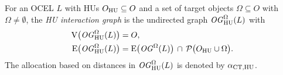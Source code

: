\begin{definition}
  For an OCEL $L$ with HUs $O_{\mathrm{HU}}\subseteq O$ and a set of target objects $\Omega\subseteq O$ with $\Omega\neq\emptyset$,
  the \textit{HU interaction graph} is the undirected graph $\mathit{OG}_{\text{HU}}^\Omega(L)$ with
  \begin{align*}
    \operatorname{V}\bigl(\mathit{OG}_{\text{HU}}^\Omega(L)\bigr) &= O, \\
    \operatorname{E}\bigl(\mathit{OG}_{\text{HU}}^\Omega(L)\bigr) &=
      \operatorname{E}\bigl(\mathit{OG}^\Omega(L)\bigr) \,\cap\, \mathcal{P}\bigl( O_{\mathrm{HU}}\cup\Omega \bigr).
  \end{align*}
  The  allocation based on distances in $\mathit{OG}_{\text{HU}}^\Omega(L)$ is denoted by $\alpha_\text{CT,HU}$.
  \label{def:og-hu}
\end{definition}

